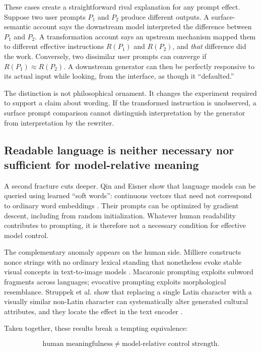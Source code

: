 \documentclass[11pt]{article}
\begin{document}
These cases create a straightforward rival explanation for any prompt effect. Suppose two user prompts \(P_1\) and \(P_2\) produce different outputs. A surface-semantic account says the downstream model interpreted the difference between \(P_1\) and \(P_2\). A transformation account says an upstream mechanism mapped them to different effective instructions \(R(P_1)\) and \(R(P_2)\), and \emph{that} difference did the work. Conversely, two dissimilar user prompts can converge if \(R(P_1) \approx R(P_2)\). A downstream generator can then be perfectly responsive to its actual input while looking, from the interface, as though it ``defaulted.''

The distinction is not philosophical ornament. It changes the experiment required to support a claim about wording. If the transformed instruction is unobserved, a surface prompt comparison cannot distinguish interpretation by the generator from interpretation by the rewriter.

\subsection{Readable language is neither necessary nor sufficient for model-relative meaning}

A second fracture cuts deeper. Qin and Eisner show that language models can be queried using learned ``soft words'': continuous vectors that need not correspond to ordinary word embeddings \citep{QinEisner2021SoftPrompts}. Their prompts can be optimized by gradient descent, including from random initialization. Whatever human readability contributes to prompting, it is therefore not a necessary condition for effective model control.

The complementary anomaly appears on the human side. Milliere constructs nonce strings with no ordinary lexical standing that nonetheless evoke stable visual concepts in text-to-image models \citep{Milliere2022MadeUpWords}. Macaronic prompting exploits subword fragments across languages; evocative prompting exploits morphological resemblance. Struppek et al. show that replacing a single Latin character with a visually similar non-Latin character can systematically alter generated cultural attributes, and they locate the effect in the text encoder \citep{Struppek2023Homoglyphs}.

Taken together, these results break a tempting equivalence:

\[
\text{human meaningfulness} \neq \text{model-relative control strength}.
\]
\end{document}

